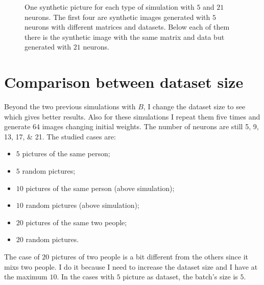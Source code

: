 \documentclass[a4paper,12pt]{article}
\begin{document}
\begin{figure}[!htbp]
  \caption[Picture of $B$ versus $L$ matrix]{One synthetic picture for each type of simulation with $5$ and $21$ neurons.
  The first four are synthetic images generated with $5$ neurons with different matrices and datasets.
  Below each of them there is the synthetic image with the same matrix and data but generated with $21$ neurons.}
  \label{fig:greg_curti_p}
\end{figure}

\section{Comparison between dataset size}
Beyond the two previous simulations with $B$, I change the dataset size to see which gives better results.
Also for these simulations I repeat them five times and generate $64$ images changing initial weights.
The number of neurons are still \numlist{5;9;13;17;21}.
The studied cases are:
\begin{itemize}
  \item $5$ pictures of the same person;
  \item $5$ random pictures;
  \item $10$ pictures of the same person (above simulation);
  \item $10$ random pictures (above simulation);
  \item $20$ pictures of the same two people;
  \item $20$ random pictures.
\end{itemize}
The case of $20$ pictures of two people is a bit different from the others since it mixs two people.
I do it because I need to increase the dataset size and I have at the maximum $10$.
In the cases with $5$ picture as dataset, the batch's size is $5$.
\end{document}
